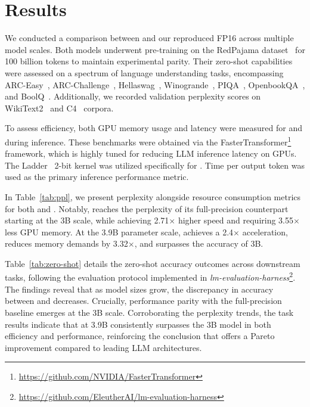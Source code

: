 \section{Results}

We conducted a comparison between  and our reproduced FP16  across multiple model scales. Both models underwent pre-training on the RedPajama dataset~\cite{redpajama} for 100 billion tokens to maintain experimental parity. Their zero-shot capabilities were assessed on a spectrum of language understanding tasks, encompassing ARC-Easy~\cite{arc}, ARC-Challenge~\cite{arc}, Hellaswag~\cite{hellaswag}, Winogrande~\cite{winoGrande}, PIQA~\cite{piqa}, OpenbookQA~\cite{openbookqa}, and BoolQ~\cite{boolq}. Additionally, we recorded validation perplexity scores on WikiText2~\cite{wikitext2} and C4~\cite{c4} corpora.

To assess efficiency, both GPU memory usage and latency were measured for  and  during inference. These benchmarks were obtained via the FasterTransformer\footnote{\url{https://github.com/NVIDIA/FasterTransformer}} framework, which is highly tuned for reducing LLM inference latency on GPUs. The Ladder~\cite{ladder} 2-bit kernel was utilized specifically for . Time per output token was used as the primary inference performance metric.

In Table~\ref{tab:ppl}, we present perplexity alongside resource consumption metrics for both  and . Notably,  reaches the perplexity of its full-precision counterpart starting at the 3B scale, while achieving 2.71$\times$ higher speed and requiring 3.55$\times$ less GPU memory. At the 3.9B parameter scale,  achieves a 2.4$\times$ acceleration, reduces memory demands by 3.32$\times$, and surpasses the accuracy of  3B.

Table~\ref{tab:zero-shot} details the zero-shot accuracy outcomes across downstream tasks, following the evaluation protocol implemented in \emph{lm-evaluation-harness}\footnote{\url{https://github.com/EleutherAI/lm-evaluation-harness}}. The findings reveal that as model sizes grow, the discrepancy in accuracy between  and  decreases. Crucially, performance parity with the full-precision baseline emerges at the 3B scale. Corroborating the perplexity trends, the task results indicate that  at 3.9B consistently surpasses the  3B model in both efficiency and performance, reinforcing the conclusion that  offers a Pareto improvement compared to leading LLM architectures.

